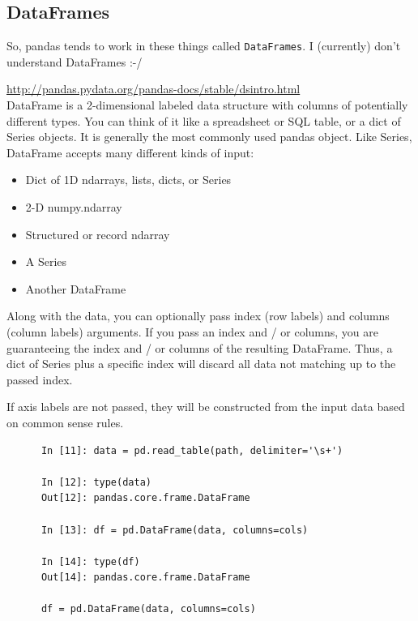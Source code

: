\documentclass[11pt,a4paper]{article}
\begin{document}
    \subsection{DataFrames}
    \smallskip
    \smallskip
    \noindent 
    So, pandas tends to work in these things called {\tt DataFrames}. 
    I (currently) don't understand DataFrames :-/

    \href{http://pandas.pydata.org/pandas-docs/stable/dsintro.html}{http://pandas.pydata.org/pandas-docs/stable/dsintro.html}\\

    DataFrame is a 2-dimensional labeled data structure with columns of
    potentially different types. You can think of it like a spreadsheet or
    SQL table, or a dict of Series objects. It is generally the most
    commonly used pandas object. Like Series, DataFrame accepts many
    different kinds of input:
    \begin{itemize}
      \item{Dict of 1D ndarrays, lists, dicts, or Series}
      \item{        2-D numpy.ndarray}
      \item{Structured or record ndarray}
      \item{A Series}
      \item{Another DataFrame}
    \end{itemize}

    Along with the data, you can optionally pass index (row labels) and
    columns (column labels) arguments. If you pass an index and / or
    columns, you are guaranteeing the index and / or columns of the
    resulting DataFrame. Thus, a dict of Series plus a specific index will
    discard all data not matching up to the passed index.
    
    If axis labels are not passed, they will be constructed from the input
    data based on common sense rules.

    \begin{lstlisting}
      In [11]: data = pd.read_table(path, delimiter='\s+')
      
      In [12]: type(data)
      Out[12]: pandas.core.frame.DataFrame
      
      In [13]: df = pd.DataFrame(data, columns=cols)
      
      In [14]: type(df)
      Out[14]: pandas.core.frame.DataFrame

      df = pd.DataFrame(data, columns=cols)
    \end{lstlisting}
\end{document}
